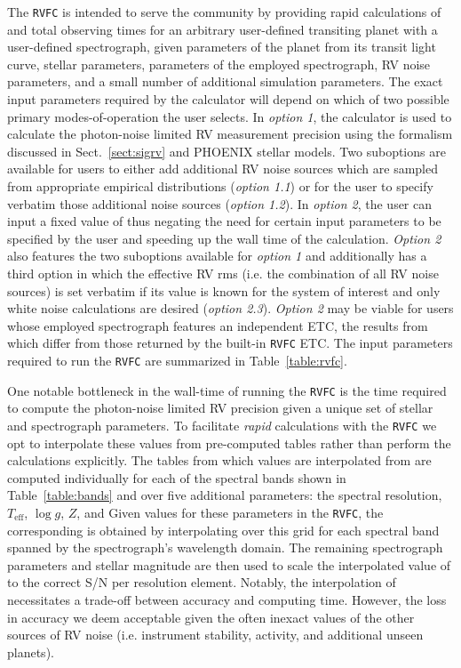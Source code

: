 The \texttt{RVFC} is intended to serve the community by providing rapid calculations of
\nrv{} and total observing times for an arbitrary user-defined transiting planet with a user-defined
spectrograph, given parameters of the planet from its
transit light curve, stellar parameters, parameters of the employed spectrograph, RV noise
parameters, and a small number of additional simulation parameters.
The exact input parameters required by the calculator will depend on which of two
possible primary modes-of-operation the user selects. In \emph{option 1}, the calculator is used to
calculate the photon-noise limited RV measurement precision \sigRV{} using the formalism discussed in
Sect.~\ref{sect:sigrv} and PHOENIX stellar models. Two suboptions are available for
users to either add additional RV noise sources which are sampled from appropriate empirical distributions
(\emph{option 1.1}) or for the user to specify verbatim those additional noise sources
(\emph{option 1.2}). In \emph{option 2}, the user can input a fixed value of \sigRV{} thus
negating the need for certain input parameters to be specified by the user and
speeding up the wall time of the calculation. \emph{Option 2} also features the two suboptions available
for \emph{option 1} and additionally has a third option in which the effective RV rms 
(i.e. the combination of all RV noise sources) is set verbatim if its value is known for the system of
interest and only white noise calculations are desired (\emph{option 2.3}).
\emph{Option 2} may be viable for users whose employed
spectrograph features an independent ETC, the results from which differ from those returned by
the built-in \texttt{RVFC} ETC. 
The input parameters required to run the \texttt{RVFC} are summarized in Table~\ref{table:rvfc}.



One notable bottleneck in the wall-time of running the \texttt{RVFC} is the time required to compute
the photon-noise limited RV precision given a unique set of stellar and spectrograph parameters. To
facilitate \emph{rapid} calculations  with the \texttt{RVFC} we opt to interpolate these values from
pre-computed tables rather than perform the calculations explicitly. The tables from which \sigRV{}
values are interpolated from are computed individually
for each of the spectral bands shown in Table~\ref{table:bands} and
over five additional parameters: the spectral resolution, $T_{\text{eff}}$, $\log{g}$, $Z$, and 
Given values for these parameters in the \texttt{RVFC}, the corresponding \sigRV{} is obtained by
interpolating over this grid for each spectral band spanned by the spectrograph's wavelength domain. 
The remaining spectrograph parameters and stellar magnitude are then used to scale the interpolated
value of \sigRV{} to the correct S/N per resolution element. Notably, 
the interpolation of \sigRV{} necessitates a trade-off between accuracy and computing time. However,
the loss in accuracy we deem acceptable given the often inexact values of the other sources of RV
noise (i.e. instrument stability, activity, and additional unseen planets).

